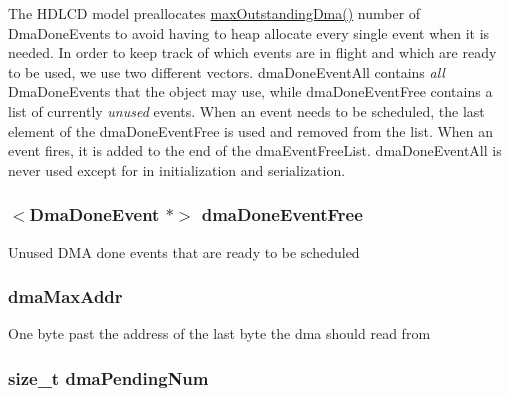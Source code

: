 The HDLCD model preallocates \hyperlink{classHDLcd_ac032891f1184bb5cfedef5c07217b0e9}{maxOutstandingDma()} number of DmaDoneEvents to avoid having to heap allocate every single event when it is needed. In order to keep track of which events are in flight and which are ready to be used, we use two different vectors. dmaDoneEventAll contains {\itshape all\/} DmaDoneEvents that the object may use, while dmaDoneEventFree contains a list of currently {\itshape unused\/} events. When an event needs to be scheduled, the last element of the dmaDoneEventFree is used and removed from the list. When an event fires, it is added to the end of the dmaEventFreeList. dmaDoneEventAll is never used except for in initialization and serialization. \hypertarget{classHDLcd_ada9c1832b166debd201f034b2fcb4ab2}{
\subsubsection[{dmaDoneEventFree}]{$<${\bf DmaDoneEvent} $\ast$$>$ {\bf dmaDoneEventFree}}}
\label{classHDLcd_ada9c1832b166debd201f034b2fcb4ab2}
Unused DMA done events that are ready to be scheduled \hypertarget{classHDLcd_a49db4d0a53163e636aa5a9e23b93b50c}{
\subsubsection[{dmaMaxAddr}]{ {\bf dmaMaxAddr}}}
\label{classHDLcd_a49db4d0a53163e636aa5a9e23b93b50c}
One byte past the address of the last byte the dma should read from \hypertarget{classHDLcd_a4f93e5868d1229f860a8ca2bfeaa5a12}{
\subsubsection[{dmaPendingNum}]{\setlength{\rightskip}{0pt plus 5cm}size\_\-t {\bf dmaPendingNum}}}
\label{classHDLcd_a4f93e5868d1229f860a8ca2bfeaa5a12}
